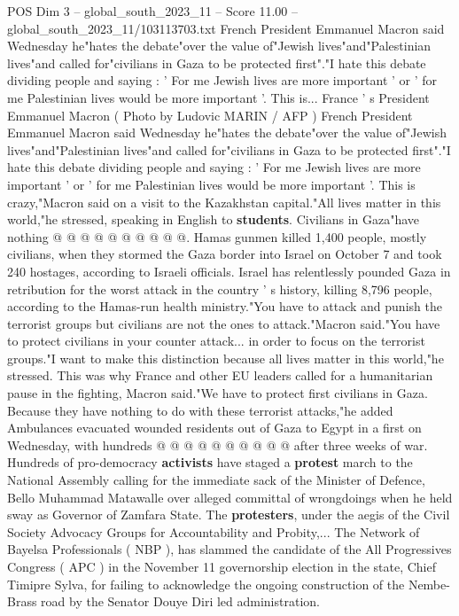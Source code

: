 \begin{textsample}{POS Dim 3 – global\_south\_2023\_11 – Score 11.00 – global\_south\_2023\_11/103113703.txt}  \label{ex:f3_pos_369}
French President Emmanuel Macron said Wednesday he"hates the debate"over the value of"Jewish lives"and"Palestinian lives"and called for"civilians in Gaza to be protected first"."I hate this debate dividing people and saying : ' For me Jewish lives are more important ' or ' for me Palestinian lives would be more important '.
This is...
France ' s President Emmanuel Macron ( Photo by Ludovic MARIN / AFP ) French President Emmanuel Macron said Wednesday he"hates the debate"over the value of"Jewish lives"and"Palestinian lives"and called for"civilians in Gaza to be protected first"."I hate this debate dividing people and saying : ' For me Jewish lives are more important ' or ' for me Palestinian lives would be more important '.
This is crazy,"Macron said on a visit to the Kazakhstan capital."All lives matter in this world,"he stressed, speaking in English to \textbf{students}.
Civilians in Gaza"have nothing @ @ @ @ @ @ @ @ @ @.
Hamas gunmen killed 1,400 people, mostly civilians, when they stormed the Gaza border into Israel on October 7 and took 240 hostages, according to Israeli officials.
Israel has relentlessly pounded Gaza in retribution for the worst attack in the country ' s history, killing 8,796 people, according to the Hamas-run health ministry."You have to attack and punish the terrorist groups but civilians are not the ones to attack."Macron said."You have to protect civilians in your counter attack... in order to focus on the terrorist groups."I want to make this distinction because all lives matter in this world,"he stressed.
This was why France and other EU leaders called for a humanitarian pause in the fighting, Macron said."We have to protect first civilians in Gaza.
Because they have nothing to do with these terrorist attacks,"he added Ambulances evacuated wounded residents out of Gaza to Egypt in a first on Wednesday, with hundreds @ @ @ @ @ @ @ @ @ @ after three weeks of war.
Hundreds of pro-democracy \textbf{activists} have staged a \textbf{protest} march to the National Assembly calling for the immediate sack of the Minister of Defence, Bello Muhammad Matawalle over alleged committal of wrongdoings when he held sway as Governor of Zamfara State.
The \textbf{protesters}, under the aegis of the Civil Society Advocacy Groups for Accountability and Probity,...
The Network of Bayelsa Professionals ( NBP ), has slammed the candidate of the All Progressives Congress ( APC ) in the November 11 governorship election in the state, Chief Timipre Sylva, for failing to acknowledge the ongoing construction of the Nembe-Brass road by the Senator Douye Diri led administration.

\end{textsample}
